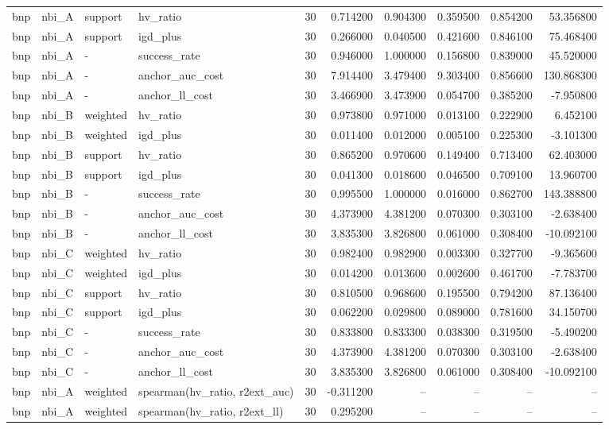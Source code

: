 \begin{landscape}
\begin{longtable}{llllrrrrrr}
bnp & nbi\_A & support & hv\_ratio & 30 & 0.714200 & 0.904300 & 0.359500 & 0.854200 & 53.356800 \\
bnp & nbi\_A & support & igd\_plus & 30 & 0.266000 & 0.040500 & 0.421600 & 0.846100 & 75.468400 \\
bnp & nbi\_A & - & success\_rate & 30 & 0.946000 & 1.000000 & 0.156800 & 0.839000 & 45.520000 \\
bnp & nbi\_A & - & anchor\_auc\_cost & 30 & 7.914400 & 3.479400 & 9.303400 & 0.856600 & 130.868300 \\
bnp & nbi\_A & - & anchor\_ll\_cost & 30 & 3.466900 & 3.473900 & 0.054700 & 0.385200 & -7.950800 \\
bnp & nbi\_B & weighted & hv\_ratio & 30 & 0.973800 & 0.971000 & 0.013100 & 0.222900 & 6.452100 \\
bnp & nbi\_B & weighted & igd\_plus & 30 & 0.011400 & 0.012000 & 0.005100 & 0.225300 & -3.101300 \\
bnp & nbi\_B & support & hv\_ratio & 30 & 0.865200 & 0.970600 & 0.149400 & 0.713400 & 62.403000 \\
bnp & nbi\_B & support & igd\_plus & 30 & 0.041300 & 0.018600 & 0.046500 & 0.709100 & 13.960700 \\
bnp & nbi\_B & - & success\_rate & 30 & 0.995500 & 1.000000 & 0.016000 & 0.862700 & 143.388800 \\
bnp & nbi\_B & - & anchor\_auc\_cost & 30 & 4.373900 & 4.381200 & 0.070300 & 0.303100 & -2.638400 \\
bnp & nbi\_B & - & anchor\_ll\_cost & 30 & 3.835300 & 3.826800 & 0.061000 & 0.308400 & -10.092100 \\
bnp & nbi\_C & weighted & hv\_ratio & 30 & 0.982400 & 0.982900 & 0.003300 & 0.327700 & -9.365600 \\
bnp & nbi\_C & weighted & igd\_plus & 30 & 0.014200 & 0.013600 & 0.002600 & 0.461700 & -7.783700 \\
bnp & nbi\_C & support & hv\_ratio & 30 & 0.810500 & 0.968600 & 0.195500 & 0.794200 & 87.136400 \\
bnp & nbi\_C & support & igd\_plus & 30 & 0.062200 & 0.029800 & 0.089000 & 0.781600 & 34.150700 \\
bnp & nbi\_C & - & success\_rate & 30 & 0.833800 & 0.833300 & 0.038300 & 0.319500 & -5.490200 \\
bnp & nbi\_C & - & anchor\_auc\_cost & 30 & 4.373900 & 4.381200 & 0.070300 & 0.303100 & -2.638400 \\
bnp & nbi\_C & - & anchor\_ll\_cost & 30 & 3.835300 & 3.826800 & 0.061000 & 0.308400 & -10.092100 \\
bnp & nbi\_A & weighted & spearman(hv\_ratio, r2ext\_auc) & 30 & -0.311200 & -- & -- & -- & -- \\
bnp & nbi\_A & weighted & spearman(hv\_ratio, r2ext\_ll) & 30 & 0.295200 & -- & -- & -- & -- \\
\end{longtable}\endgroup

\end{landscape}
